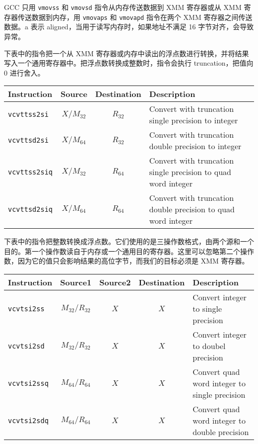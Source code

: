 GCC 只用 \verb|vmovss| 和 \verb|vmovsd| 指令从内存传送数据到 XMM 寄存器或从 XMM 寄存器传送数据到内存，用 \verb|vmovaps| 和 \verb|vmovapd| 指令在两个 XMM 寄存器之间传送数据。a 表示 aligned，当用于读写内存时，如果地址不满足 16 字节对齐，会导致异常。

下表中的指令把一个从 XMM 寄存器或内存中读出的浮点数进行转换，并将结果写入一个通用寄存器中。把浮点数转换成整数时，指令会执行 truncation，把值向 0 进行舍入。

\begin{table}[!ht]
    \centering
    \begin{tabular}{lccl}
        \toprule
        Instruction & Source & Destination & Description \\
        \midrule
        \texttt{vcvttss2si} & $X/M_{32}$ & $R_{32}$ & Convert with truncation single precision to integer \\
        \texttt{vcvttsd2si} & $X/M_{64}$ & $R_{32}$ & Convert with truncation double precision to integer \\
        \texttt{vcvttss2siq} & $X/M_{32}$ & $R_{64}$ & Convert with truncation single precision to quad word integer \\
        \texttt{vcvttsd2siq} & $X/M_{64}$ & $R_{64}$ & Convert with truncation double precision to quad word integer \\
        \bottomrule
    \end{tabular}
\end{table}

下表中的指令把整数转换成浮点数。它们使用的是三操作数格式，由两个源和一个目的。第一个操作数读自于内存或一个通用目的寄存器。这里可以忽略第二个操作数，因为它的值只会影响结果的高位字节，而我们的目标必须是 XMM 寄存器。

\begin{table}[!ht]
    \centering
    \begin{tabular}{lcccl}
        \toprule
        Instruction & Source1 & Source2 & Destination & Description \\
        \midrule
        \texttt{vcvtsi2ss} & $M_{32}/R_{32}$ & $X$ & $X$ & Convert integer to single precision \\
        \texttt{vcvtsi2sd} & $M_{32}/R_{32}$ & $X$ & $X$ & Convert integer to doubel precision \\
        \texttt{vcvtsi2ssq} & $M_{64}/R_{64}$ & $X$ & $X$ & Convert quad word integer to single precision \\
        \texttt{vcvtsi2sdq} & $M_{64}/R_{64}$ & $X$ & $X$ & Convert quad word integer to double precision \\
        \bottomrule
    \end{tabular}
\end{table}

